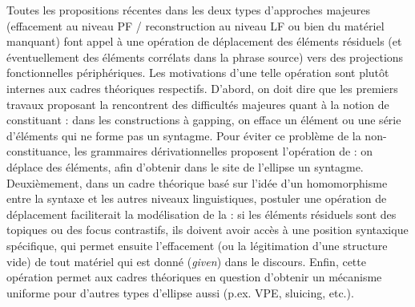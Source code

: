 Toutes les propositions récentes dans les deux types d’approches majeures (effacement au niveau PF / reconstruction au niveau LF ou bien  du matériel manquant) font appel à une opération de déplacement des éléments résiduels (et éventuellement des éléments corrélats dans la phrase source) vers des projections fonctionnelles périphériques. Les motivations d’une telle opération sont plutôt internes aux cadres théoriques respectifs. D’abord, on doit dire que les premiers travaux proposant la  rencontrent des difficultés majeures quant à la notion de constituant : dans les constructions à gapping, on efface un élément ou une série d’éléments qui ne forme pas un syntagme. Pour éviter ce problème de la non-constituance, les grammaires dérivationnelles proposent l’opération de  : on déplace des éléments, afin d’obtenir dans le site de l’ellipse un syntagme. Deuxièmement, dans un cadre théorique basé sur l’idée d’un homomorphisme entre la syntaxe et les autres niveaux linguistiques, postuler une opération de déplacement faciliterait la modélisation de la  : si les éléments résiduels sont des topiques ou des focus contrastifs, ils doivent avoir accès à une position syntaxique spécifique, qui permet ensuite l’effacement (ou la légitimation d’une structure vide) de tout matériel qui est donné (\textit{given}) dans le discours. Enfin, cette opération permet aux cadres théoriques en question d’obtenir un mécanisme uniforme pour d’autres types d’ellipse aussi (p.ex. VPE, sluicing, etc.).

